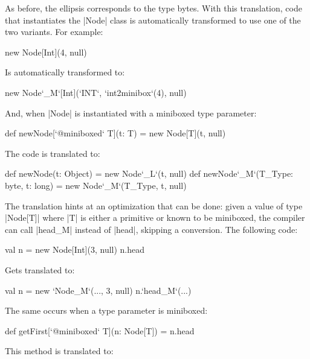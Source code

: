 As before, the ellipsis corresponds to the type bytes. With this translation, code that instantiates the |Node| class is automatically transformed to use one of the two variants. For example:

\begin{lstlisting-nobreak}
 new Node[Int](4, null)
\end{lstlisting-nobreak}

Is automatically transformed to:

\begin{lstlisting-nobreak}
 new Node`_M`[Int](`INT`, `int2minibox`(4), null)
\end{lstlisting-nobreak}

And, when |Node| is instantiated with a miniboxed type parameter:

\begin{lstlisting-nobreak}
 def newNode[`@miniboxed` T](t: T) =
   new Node[T](t, null)
\end{lstlisting-nobreak}

The code is translated to:

\begin{lstlisting-nobreak}
 def newNode(t: Object) = new Node`_L`(t, null)
 def newNode`_M`(T_Type: byte, t: long) =
   new Node`_M`(T_Type, t, null)
\end{lstlisting-nobreak}

The translation hints at an optimization that can be done: given a value of type |Node[T]| where |T| is either a primitive or known to be miniboxed, the compiler can call |head_M| instead of |head|, skipping a conversion. The following code:

\begin{lstlisting-nobreak}
 val n = new Node[Int](3, null)
 n.head
\end{lstlisting-nobreak}

Gets translated to:

\begin{lstlisting-nobreak}
 val n = new `Node_M`(..., 3, null)
 n.`head_M`(...)
\end{lstlisting-nobreak}

The same occurs when a type parameter is miniboxed:

\begin{lstlisting-nobreak}
 def getFirst[`@miniboxed` T](n: Node[T]) = n.head
\end{lstlisting-nobreak}

This method is translated to:

